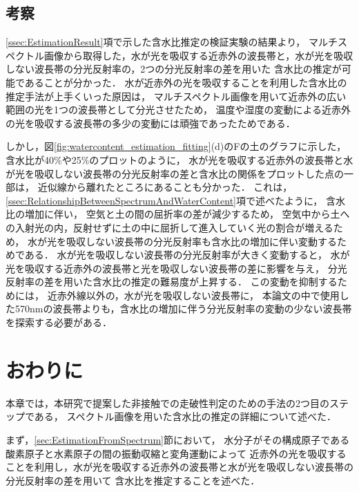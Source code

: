 \clearpage


\subsection{考察}
\label{ssec:EstimationConsideration}

\ref{ssec:EstimationResult}項で示した含水比推定の検証実験の結果より，
マルチスペクトル画像から取得した，水が光を吸収する近赤外の波長帯と，水が光を吸収しない波長帯の分光反射率の，2つの分光反射率の差を用いた
含水比の推定が可能であることが分かった．
水が近赤外の光を吸収することを利用した含水比の推定手法が上手くいった原因は，
マルチスペクトル画像を用いて近赤外の広い範囲の光を1つの波長帯として分光させたため，
温度や湿度の変動による近赤外の光を吸収する波長帯の多少の変動には頑強であったためである．

しかし，図\ref{fig:watercontent_estimation_fitting}(d)のFの土のグラフに示した，含水比が40$\%$や25$\%$のプロットのように，
水が光を吸収する近赤外の波長帯と水が光を吸収しない波長帯の分光反射率の差と含水比の関係をプロットした点の一部は，
近似線から離れたところにあることも分かった．
これは，\ref{ssec:RelationshipBetweenSpectrumAndWaterContent}項で述べたように，
含水比の増加に伴い，
空気と土の間の屈折率の差が減少するため，
空気中から土への入射光の内，反射せずに土の中に屈折して進入していく光の割合が増えるため，
水が光を吸収しない波長帯の分光反射率も含水比の増加に伴い変動するためである．
水が光を吸収しない波長帯の分光反射率が大きく変動すると，
水が光を吸収する近赤外の波長帯と光を吸収しない波長帯の差に影響を与え，
分光反射率の差を用いた含水比の推定の難易度が上昇する．
この変動を抑制するためには，
近赤外線以外の，水が光を吸収しない波長帯に，
本論文の中で使用した570nmの波長帯よりも，含水比の増加に伴う分光反射率の変動の少ない波長帯を探索する必要がある．

\newpage

\section{おわりに}

本章では，本研究で提案した非接触での走破性判定のための手法の2つ目のステップである，
スペクトル画像を用いた含水比の推定の詳細について述べた．

まず，\ref{sec:EstimationFromSpectrum}節において，
水分子がその構成原子である酸素原子と水素原子の間の振動収縮と変角運動によって
近赤外の光を吸収することを利用し，水が光を吸収する近赤外の波長帯と水が光を吸収しない波長帯の分光反射率の差を用いて
含水比を推定することを述べた．

